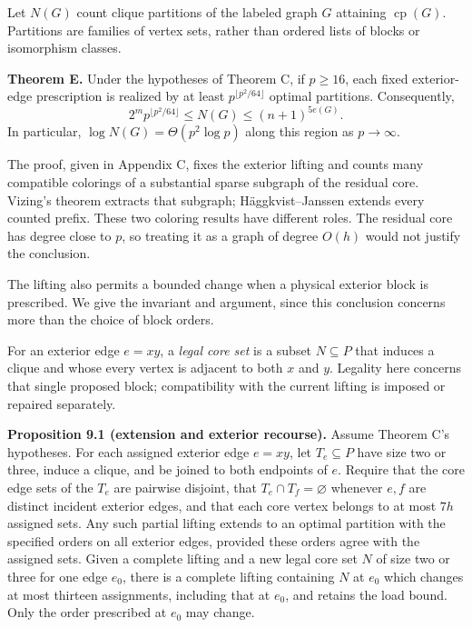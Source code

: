 \documentclass[english,11pt,a4paper]{article}
\begin{document}
Let \(N(G)\) count clique partitions of the labeled graph \(G\)
attaining \(\operatorname{cp}(G)\). Partitions are families of vertex
sets, rather than ordered lists of blocks or isomorphism classes.

\textbf{Theorem E.} Under the hypotheses of Theorem C, if \(p\ge16\),
each fixed exterior-edge prescription is realized by at least
\(p^{\lfloor p^2/64\rfloor}\) optimal partitions. Consequently, \[
2^m p^{\lfloor p^2/64\rfloor}\le N(G)\le(n+1)^{5e(G)}.
\] In particular, \(\log N(G)=\Theta(p^2\log p)\) along this region as
\(p\to\infty\).

The proof, given in Appendix C, fixes the exterior lifting and counts
many compatible colorings of a substantial sparse subgraph of the
residual core. Vizing's theorem extracts that subgraph;
Häggkvist--Janssen extends every counted prefix. These two coloring
results have different roles. The residual core has degree close to
\(p\), so treating it as a graph of degree \(O(h)\) would not justify
the conclusion.

The lifting also permits a bounded change when a physical exterior block
is prescribed. We give the invariant and argument, since this conclusion
concerns more than the choice of block orders.

For an exterior edge \(e=xy\), a \emph{legal core set} is a subset
\(N\subseteq P\) that induces a clique and whose every vertex is
adjacent to both \(x\) and \(y\). Legality here concerns that single
proposed block; compatibility with the current lifting is imposed or
repaired separately.

\textbf{Proposition 9.1 (extension and exterior recourse).} Assume
Theorem C's hypotheses. For each assigned exterior edge \(e=xy\), let
\(T_e\subseteq P\) have size two or three, induce a clique, and be
joined to both endpoints of \(e\). Require that the core edge sets of
the \(T_e\) are pairwise disjoint, that \(T_e\cap T_f=\varnothing\)
whenever \(e,f\) are distinct incident exterior edges, and that each
core vertex belongs to at most \(7h\) assigned sets. Any such partial
lifting extends to an optimal partition with the specified orders on all
exterior edges, provided these orders agree with the assigned sets.
Given a complete lifting and a new legal core set \(N\) of size two or
three for one edge \(e_0\), there is a complete lifting containing \(N\)
at \(e_0\) which changes at most thirteen assignments, including that at
\(e_0\), and retains the load bound. Only the order prescribed at
\(e_0\) may change.
\end{document}
